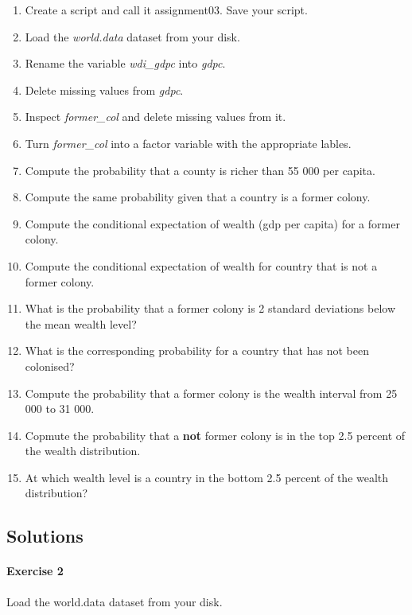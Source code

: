\documentclass[]{article}
\providecommand{\tightlist}{%
  \setlength{\itemsep}{0pt}\setlength{\parskip}{0pt}}
\let\oldparagraph\paragraph
\renewcommand{\paragraph}[1]{\oldparagraph{#1}\mbox{}}
\theoremstyle{definition}
\theoremstyle{definition}
\theoremstyle{definition}
\theoremstyle{remark}
\begin{document}
\begin{enumerate}
\def\labelenumi{\arabic{enumi}.}
\tightlist
\item
  Create a script and call it assignment03. Save your script.
\item
  Load the \emph{world.data} dataset from your disk.
\item
  Rename the variable \emph{wdi\_gdpc} into \emph{gdpc}.
\item
  Delete missing values from \emph{gdpc}.
\item
  Inspect \emph{former\_col} and delete missing values from it.
\item
  Turn \emph{former\_col} into a factor variable with the appropriate
  lables.
\item
  Compute the probability that a county is richer than 55 000 per
  capita.
\item
  Compute the same probability given that a country is a former colony.
\item
  Compute the conditional expectation of wealth (gdp per capita) for a
  former colony.
\item
  Compute the conditional expectation of wealth for country that is not
  a former colony.
\item
  What is the probability that a former colony is 2 standard deviations
  below the mean wealth level?
\item
  What is the corresponding probability for a country that has not been
  colonised?
\item
  Compute the probability that a former colony is the wealth interval
  from 25 000 to 31 000.
\item
  Copmute the probability that a \textbf{not} former colony is in the
  top 2.5 percent of the wealth distribution.
\item
  At which wealth level is a country in the bottom 2.5 percent of the
  wealth distribution?
\end{enumerate}

\subsection{Solutions}\label{solutions-2}

\paragraph{Exercise 2}\label{exercise-2-1}

Load the world.data dataset from your disk.
\end{document}
